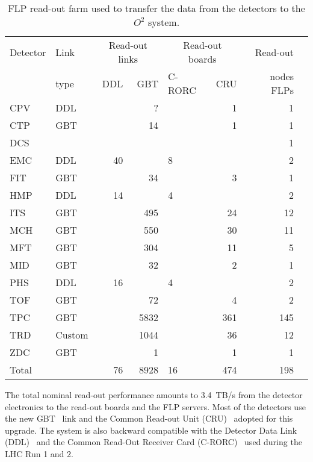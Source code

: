 \begin{table}[h!]
\centering
\caption{FLP read-out farm used to transfer the data from the detectors to the $O^2$ system.}
\label{tab:flp_farm_links}
\begin{tabular} { l l r r l r r r}
\hline
Detector &  Link 	&  \multicolumn{2}{c}{Read-out links}  &  \multicolumn{2}{c}{Read-out boards} & Read-out \tabularnewline
         &  type 	& DDL   	& GBT       & C-RORC& CRU	& nodes FLPs \tabularnewline
\hline
CPV     & DDL           &               & ?         &       & 1         &   1 \tabularnewline
CTP     & GBT           &               & 14        &       & 1         &   1 \tabularnewline
DCS     &               &               &           &       &           &   1 \tabularnewline
EMC     & DDL           & 40            &           & 8     &           &   2 \tabularnewline
FIT     & GBT           &               & 34        &       & 3         &   1 \tabularnewline
HMP     & DDL           & 14            &           & 4     &           &   2 \tabularnewline
ITS     & GBT           &               & 495       &       & 24        &  12 \tabularnewline
MCH     & GBT           &               & 550       &       & 30        &  11 \tabularnewline
MFT     & GBT           &               & 304       &       & 11        &   5 \tabularnewline
MID     & GBT           &               & 32        &       & 2         &   1 \tabularnewline
PHS     & DDL           & 16            &           & 4     &           &   2 \tabularnewline
TOF     & GBT           &               & 72        &       & 4         &   2 \tabularnewline
TPC     & GBT           &               & 5832      &       & 361       & 145 \tabularnewline
TRD     & Custom        &               & 1044      &       & 36        &  12 \tabularnewline
ZDC     & GBT           &               & 1         &       & 1         &   1 \tabularnewline
Total   &               & 76            & 8928      & 16    & 474       & 198 \tabularnewline
\end{tabular}
\end{table}
The total nominal read-out performance amounts to 3.4~TB/s from the detector electronics to the read-out boards and the FLP servers. Most of the detectors use the new GBT~\cite{ref_GBT} link and the Common Read-out Unit (CRU)~\cite{ref_CRU_HW, ref_CRU_FW} adopted for this upgrade. The system is also backward compatible with the Detector Data Link (DDL)~\cite{ref_DDL} and the Common Read-Out Receiver Card (C-RORC)~\cite{ref_RORC} used during the LHC Run 1 and 2. 

